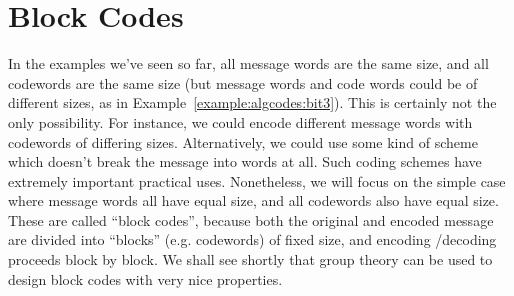 % 
% 
% 
 
\section{Block Codes}
 
In the examples we've seen so far,  all message words are the same size, and all codewords are the same size (but message words and code words could be of different sizes, as in Example~\ref{example:algcodes:bit3}). This is certainly not the only possibility. For instance, we could encode different message words with codewords of differing sizes. Alternatively, we could use some kind of scheme which doesn't break the message into words at all. Such coding schemes have extremely important practical uses. Nonetheless, we will focus on the simple case where message words all have equal size, and all codewords also have equal size. These are called  ``block codes'', because both the original and encoded message are divided into ``blocks'' (e.g. codewords) of fixed size, and encoding /decoding proceeds block by block.  We shall see shortly that group
theory  can be used to design block codes with very nice properties. 

